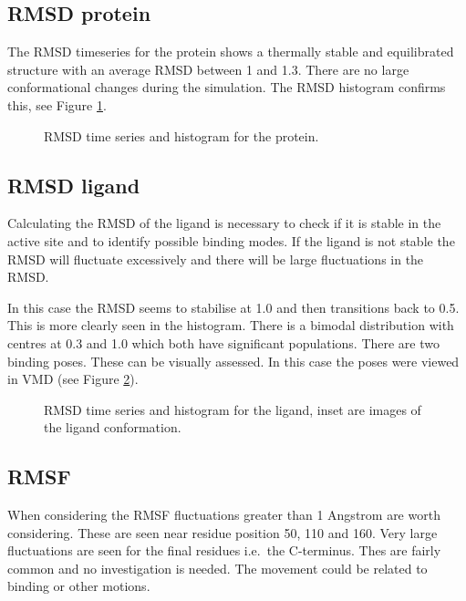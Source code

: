 \documentclass[twocolumn]{bmcart}%
\begin{document}
\subsection*{RMSD protein}
The RMSD timeseries for the protein shows a thermally stable and equilibrated structure with
an average RMSD between 1 and 1.3. There are no large conformational changes during the simulation. The RMSD histogram confirms this, see Figure \ref{fig:rmsdprotein}.

\begin{figure}[h!]
  \caption{
      RMSD time series and histogram for the protein.}
\label{fig:rmsdprotein}
      \end{figure}

\subsection*{RMSD ligand}
Calculating the RMSD of the ligand is necessary to check if it is stable in the active site and to identify possible binding modes. If the ligand is not stable the RMSD will fluctuate excessively and there will be large fluctuations in the RMSD.

In this case the RMSD seems to stabilise at 1.0 and then transitions back to 0.5. This is more clearly seen in the histogram. There is a bimodal distribution with centres at 0.3 and 1.0 which both have significant populations. There are two binding poses. These can be visually assessed. In this case the
poses were viewed in VMD \cite{hump_vmd_1996} (see Figure \ref{fig:rmsdligand}).

\begin{figure}[h!]
  \caption{
      RMSD time series and histogram for the ligand, inset are images of the ligand conformation.}
\label{fig:rmsdligand}
      \end{figure}

\subsection*{RMSF}
When considering the RMSF fluctuations greater than 1 Angstrom are worth
considering. These are seen near residue position 50, 110 and 160. Very
large fluctuations are seen for the final residues i.e.~the C-terminus.
Thes are fairly common and no investigation is needed. The movement could be
related to binding or other motions.
\end{document}
